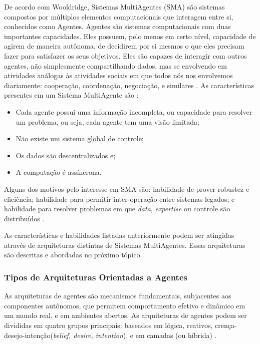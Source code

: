 De acordo com Wooldridge, Sistemas MultiAgentes (SMA) são sistemas compostos
por múltiplos elementos computacionais que interagem entre si, conhecidos como
Agentes. Agentes são sistemas computacionais com duas importantes capacidades.
Eles possuem, pelo menos em certo nível, capacidade de agirem de maneira
autônoma, de decidirem por si mesmos o que eles precisam fazer para satisfazer
os seus objetivos. Eles são capazes de interagir com outros agentes, não
simplesmente compartilhando dados,  mas se envolvendo em atividades análogas às
atividades sociais em que todos nós nos envolvemos diariamente: cooperação,
coordenação, negociação, e similares \cite{wooldridge2009}. As características
presentes em um Sistema MultiAgente são  \cite{jennings1998}:

\begin{itemize}
  \item Cada agente possui uma informação incompleta, ou capacidade para resolver um problema, ou seja, cada agente tem uma visão limitada;
  \item Não existe um sistema global de controle;
  \item Os dados são descentralizados e;
  \item A computação é assíncrona.
\end{itemize}

Alguns dos motivos pelo interesse em SMA são: habilidade de prover robustez e
eficiência; habilidade para permitir inter-operação entre sistemas legados; e
habilidade para resolver problemas em que \textit{data}, \textit{expertise} ou
controle são distribuídos \cite{jennings1998}.

As características e habilidades listadas anteriormente podem ser atingidas
através de arquiteturas distintas de Sistemas MultiAgentes.
Essas arquiteturas são descritas e abordadas no próximo tópico.

    \subsubsection{Tipos de Arquiteturas Orientadas a Agentes}

As arquiteturas de agentes são mecanismos fundamentais, subjacentes aos
componentes autônomos, que permitem comportamento efetivo e dinâmico em um
mundo real, e em ambientes abertos. As arquiteturas de agentes podem ser
divididas em quatro grupos principais: baseados em lógica, reativos,
crença-desejo-intenção(\textit{belief, desire, intention}), e em camadas (ou
híbrida) \cite{fabio2007}.

